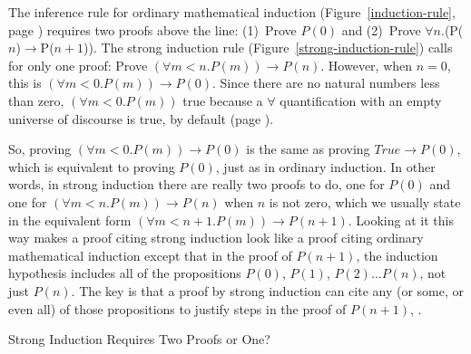 \begin{aside}
The inference rule for ordinary mathematical induction
(Figure~\ref{induction-rule}, page \pageref{induction-rule})
requires two proofs above the line:
(1)~Prove $P(0)$ and (2)~Prove $\forall$$n$.(P($n$)$\rightarrow$P($n+1$)).
The strong induction rule
(Figure~\ref{strong-induction-rule})
calls for only one proof:
Prove $(\forall m<n.P(m))\rightarrow P(n)$.
However, when $n = 0$, this is
$(\forall m<0.P(m))\rightarrow P(0)$.
Since there
are no natural numbers less than zero,
$(\forall m<0.P(m))$ true because
a $\forall$ quantification with an empty universe of discourse
is true, by default
(page \pageref{empty-forall}).

So, proving $(\forall m<0.P(m))\rightarrow P(0)$
is the same as proving $True \rightarrow P(0)$,
which is equivalent to proving $P(0)$,
just as in ordinary induction.
In other words, in strong induction there are really two proofs to do,
one for $P(0)$ and one for $(\forall m<n.P(m))\rightarrow P(n)$
when $n$ is not zero, which we usually state in the
equivalent form $(\forall m<n+1.P(m))\rightarrow P(n+1)$.
Looking at it this way makes a proof citing strong induction look like
a proof citing ordinary mathematical induction except that
in the proof of $P(n+1)$, the
induction hypothesis
includes all of the propositions $P(0)$, $P(1)$, $P(2) \dots P(n)$, not just $P(n)$.
The key is that a proof by strong induction
can cite any (or some, or even all) of those propositions
to justify steps in the proof of $P(n+1)$, .
\caption{Strong Induction Requires Two Proofs or One?}
\label{strong-induction-rule-2-hyps-or-1}
\end{aside}

